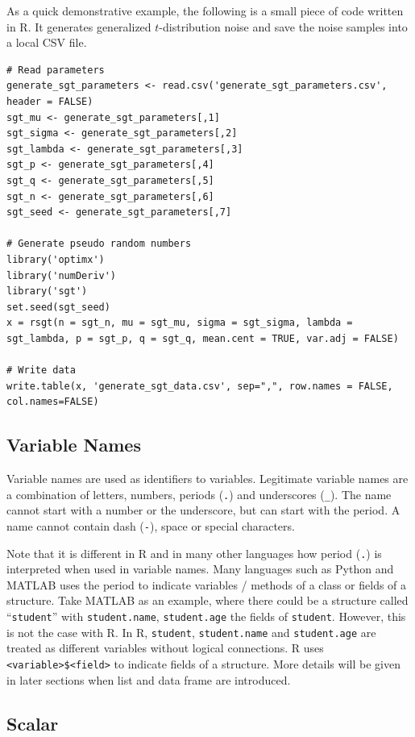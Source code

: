 As a quick demonstrative example, the following is a small piece of code written in R. It generates generalized $t$-distribution noise and save the noise samples into a local CSV file.
\begin{lstlisting}
# Read parameters
generate_sgt_parameters <- read.csv('generate_sgt_parameters.csv', header = FALSE)
sgt_mu <- generate_sgt_parameters[,1]
sgt_sigma <- generate_sgt_parameters[,2]
sgt_lambda <- generate_sgt_parameters[,3]
sgt_p <- generate_sgt_parameters[,4]
sgt_q <- generate_sgt_parameters[,5]
sgt_n <- generate_sgt_parameters[,6]
sgt_seed <- generate_sgt_parameters[,7]

# Generate pseudo random numbers
library('optimx')
library('numDeriv')
library('sgt')
set.seed(sgt_seed)
x = rsgt(n = sgt_n, mu = sgt_mu, sigma = sgt_sigma, lambda = sgt_lambda, p = sgt_p, q = sgt_q, mean.cent = TRUE, var.adj = FALSE)

# Write data
write.table(x, 'generate_sgt_data.csv', sep=",", row.names = FALSE, col.names=FALSE)
\end{lstlisting}

\subsection{Variable Names}

Variable names are used as identifiers to variables. Legitimate variable names are a combination of letters, numbers, periods (\verb|.|) and underscores (\verb|_|). The name cannot start with a number or the underscore, but can start with the period. A name cannot contain dash (\verb|-|), space or special characters.

Note that it is different in R and in many other languages how period (\verb|.|) is interpreted when used in variable names. Many languages such as Python and MATLAB uses the period to indicate variables / methods of a class or fields of a structure. Take MATLAB as an example, where there could be a structure called ``\verb|student|'' with \verb|student.name|, \verb|student.age| the fields of \verb|student|. However, this is not the case with R. In R, \verb|student|, \verb|student.name| and \verb|student.age| are treated as different variables without logical connections. R uses \verb|<variable>$<field>| to indicate fields of a structure. More details will be given in later sections when list and data frame are introduced.

\subsection{Scalar}

